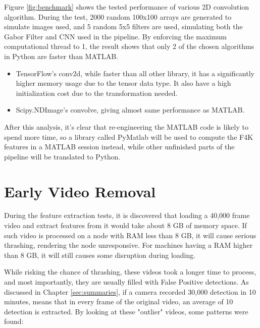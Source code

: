 \documentclass[bsc,logo,twoside,fullspacing,parskip]{infthesis}
\begin{document}
Figure \ref{fig:benchmark} shows the tested performance of various 2D convolution algorithm. During the test, 2000 random 100x100 arrays are generated to simulate images used, and 5 random 5x5 filters are used, simulating both the Gabor Filter and CNN used in the pipeline. By enforcing the maximum computational thread to 1, the result shows that only 2 of the chosen algorithms in Python are faster than MATLAB.
\begin{itemize}
\item
TensorFlow's conv2d, while faster than all other library, it has a significantly higher memory usage due to the tensor data type. It also have a high initialization cost due to the transformation needed.
\item
Scipy.NDImage's convolve, giving almost same performance as MATLAB.
\end{itemize}

After this analysis, it's clear that re-engineering the MATLAB code is likely to spend more time, so a library called PyMatlab will be used to compute the F4K features in a MATLAB session instead, while other unfinished parts of the pipeline will be translated to Python.

\section{Early Video Removal}
\label{sec:earlyremove}

During the feature extraction tests, it is discovered that loading a 40,000 frame video and extract features from it would take about 8 GB of memory space. 
If such video is processed on a node with RAM less than 8 GB, it will cause serious thrashing, rendering the node unresponsive. For machines having a RAM higher than 8 GB, it will still causes some disruption during loading.  

While risking the chance of thrashing, these videos took a longer time to process, and most importantly, they are usually filled with False Positive detections. As discussed in Chapter \ref{sec:summaries}, if a camera recorded 30,000 detection in 10 minutes, means that in every frame of the original video, an average of 10 detection is extracted. By looking at these "outlier" videos, some patterns were found:
\end{document}
